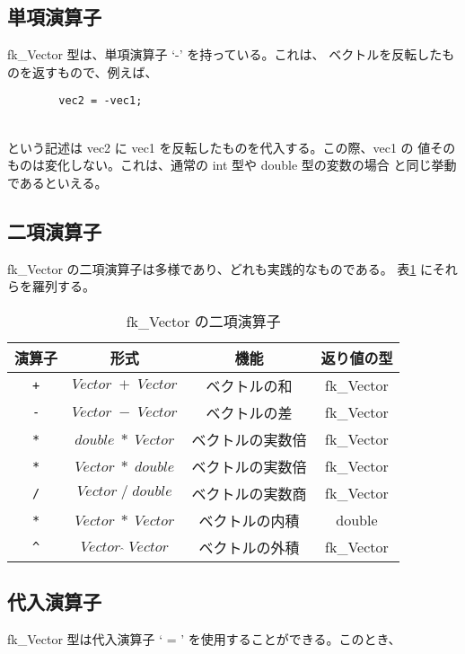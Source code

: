 \subsection{単項演算子}
fk\_Vector 型は、単項演算子 `-' を持っている。これは、
ベクトルを反転したものを返すもので、例えば、
\\
\begin{screen}
\begin{verbatim}
        vec2 = -vec1;
\end{verbatim}
\end{screen}
~ \\
という記述は vec2 に vec1 を反転したものを代入する。この際、vec1 の
値そのものは変化しない。これは、通常の int 型や double 型の変数の場合
と同じ挙動であるといえる。
\subsection{二項演算子}
fk\_Vector の二項演算子は多様であり、どれも実践的なものである。
表\ref{tbl:fkVec1}
にそれらを羅列する。
\begin{table}[H]
\caption{fk\_Vector の二項演算子}
\label{tbl:fkVec1}
\begin{center}
\begin{tabular}{|c|c|c|c|}
\hline
演算子 & 形式 & 機能 & 返り値の型 \\ \hline \hline
\verb-+- & \(Vector \; + \; Vector\) & ベクトルの和 & fk\_Vector \\ \hline
\verb+-+ & \(Vector \; - \; Vector\) & ベクトルの差 & fk\_Vector \\ \hline
\verb+*+ & \(double \; * \; Vector\) & ベクトルの実数倍 & fk\_Vector \\ \hline
\verb+*+ & \(Vector \; * \; double\) & ベクトルの実数倍 & fk\_Vector \\ \hline
\verb+/+ & \(Vector \; / \; double\) & ベクトルの実数商 & fk\_Vector \\ \hline
\verb+*+ & \(Vector \; * \; Vector\) & ベクトルの内積 & double \\ \hline
\verb+^+ & \(Vector \; \hat{} \; Vector\) & ベクトルの外積 &
							fk\_Vector \\ \hline
\end{tabular}
\end{center}
\end{table}

\subsection{代入演算子}
fk\_Vector 型は代入演算子 ` = ' を使用することができる。このとき、


